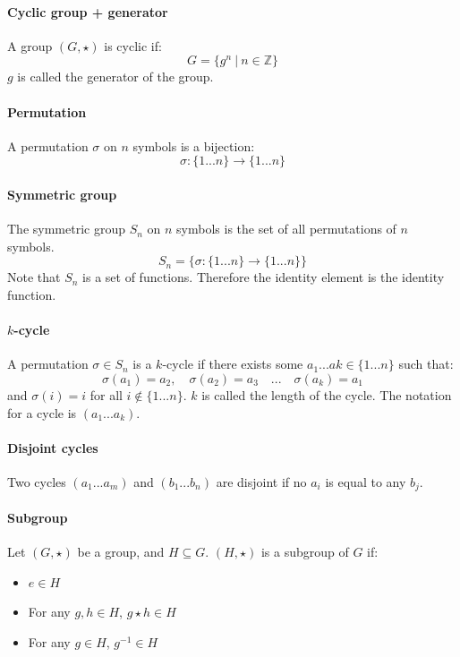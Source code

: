 \documentclass{scrartcl}
\newcommand{\Z}{\mathbb{Z}}
\begin{document}
\paragraph{Cyclic group + generator}
A group $ (G, \star) $ is cyclic if:
\begin{equation}
G = \{ g^{n} \ | \ n \in \Z \} 
\end{equation}
$ g $ is called the generator of the group.
\paragraph{Permutation}
A permutation $ \sigma $ on $ n $ symbols is a bijection:
\begin{equation}
\sigma : \{1...n\} \to \{1...n\}
\end{equation}
\paragraph{Symmetric group}
The symmetric group $ S_{n} $ on $ n $ symbols is the set of all permutations of $ n $ symbols.
\begin{equation}
S_{n} = \{\sigma : \{1...n\} \to \{1...n\}\}
\end{equation}
Note that $ S_{n} $ is a set of functions. Therefore the identity element is the identity function.
\paragraph{$ k $-cycle}
A permutation $ \sigma \in S_{n} $ is a $ k $-cycle if there exists some $ a_{1}...a{k}  \in \{1...n\} $ such that:
\begin{equation}
\sigma(a_{1}) = a_{2}, \quad \sigma(a_{2}) = a_{3} \quad ... \quad \sigma(a_{k}) = a_{1}
\end{equation}
and $ \sigma(i) = i $ for all $ i \notin \{1...n\} $. $ k $ is called the length of the cycle. The notation for a cycle is $ (a_{1}...a_{k}) $.
\paragraph{Disjoint cycles}
Two cycles $ (a_{1}...a_{m}) $ and $ (b_{1}...b_{n}) $ are disjoint if no $ a_{i} $ is equal to any $ b_{j} $.
\paragraph{Subgroup}
Let $ (G, \star) $ be a group, and $ H \subseteq G $. $ (H, \star) $ is a subgroup of $ G $ if:
\begin{itemize}
\item $ e \in H $
\item For any $ g, h \in H $,  $ g \star h \in H $
\item For any $ g \in H $, $ g^{-1} \in H $
\end{itemize}
\end{document}
